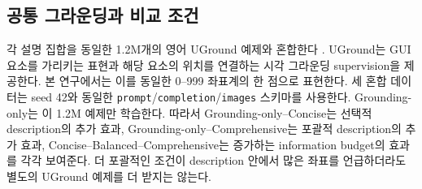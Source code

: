 \subsection{공통 그라운딩과 비교 조건}

각 설명 집합을 동일한 1.2M개의 영어 UGround 예제와 혼합한다
\citep{gou2025uground}. UGround는 GUI 요소를 가리키는 표현과
해당 요소의 위치를 연결하는 시각 그라운딩 supervision을 제공한다.
본 연구에서는 이를 동일한 0--999 좌표계의 한 점으로 표현한다.
세 혼합 데이터는 seed 42와 동일한
\texttt{prompt}/\texttt{completion}/\texttt{images} 스키마를 사용한다.
Grounding-only는 이 1.2M 예제만 학습한다. 따라서
Grounding-only--Concise는 선택적 description의 추가 효과,
Grounding-only--Comprehensive는 포괄적 description의 추가 효과,
Concise--Balanced--Comprehensive는 증가하는 information budget의
효과를 각각 보여준다. 더 포괄적인 조건이 description 안에서 많은
좌표를 언급하더라도 별도의 UGround 예제를 더 받지는 않는다.
